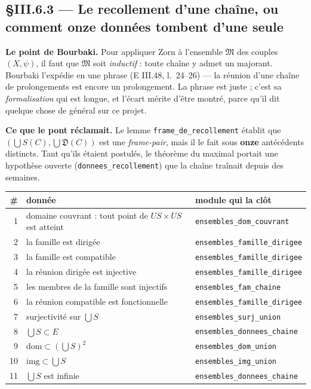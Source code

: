 \subsection{§III.6.3 --- Le recollement d'une chaîne, ou comment onze données
tombent d'une seule}
\label{sec:iii6-recollement}

\textbf{Le point de Bourbaki.} Pour appliquer Zorn à l'ensemble $\mathfrak{M}$ des
couples $(X,\psi)$, il faut que $\mathfrak{M}$ soit \emph{inductif} : toute chaîne
y admet un majorant. Bourbaki l'expédie en une phrase (E III.48, l.~24--26) --- la
réunion d'une chaîne de prolongements est encore un prolongement. La phrase est
juste ; c'est sa \emph{formalisation} qui est longue, et l'écart mérite d'être
montré, parce qu'il dit quelque chose de général sur ce projet.

\textbf{Ce que le pont réclamait.} Le lemme \texttt{frame\_de\_recollement}
établit que $(\bigcup S(C), \bigcup \mathfrak{D}(C))$ est une \emph{frame-pair},
mais il le fait sous \textbf{onze} antécédents distincts. Tant qu'ils étaient
postulés, le théorème du maximal portait une hypothèse ouverte
(\texttt{donnees\_recollement}) que la chaîne traînait depuis des semaines.

\begin{center}
\small
\begin{tabular}{@{}rlp{5.6cm}@{}}
\toprule
\# & donnée & module qui la clôt \\
\midrule
1 & domaine couvrant : tout point de $US\times US$ est atteint & \texttt{ensembles\_dom\_couvrant} \\
2 & la famille est dirigée & \texttt{ensembles\_famille\_dirigee} \\
3 & la famille est compatible & \texttt{ensembles\_famille\_dirigee} \\
4 & la réunion dirigée est injective & \texttt{ensembles\_famille\_dirigee} \\
5 & les membres de la famille sont injectifs & \texttt{ensembles\_fam\_chaine} \\
6 & la réunion compatible est fonctionnelle & \texttt{ensembles\_famille\_dirigee} \\
7 & surjectivité sur $\bigcup S$ & \texttt{ensembles\_surj\_union} \\
8 & $\bigcup S \subset E$ & \texttt{ensembles\_donnees\_chaine} \\
9 & $\mathrm{dom} \subset (\bigcup S)^2$ & \texttt{ensembles\_dom\_union} \\
10 & $\mathrm{img} \subset \bigcup S$ & \texttt{ensembles\_img\_union} \\
11 & $\bigcup S$ est infinie & \texttt{ensembles\_donnees\_chaine} \\
\bottomrule
\end{tabular}
\end{center}

